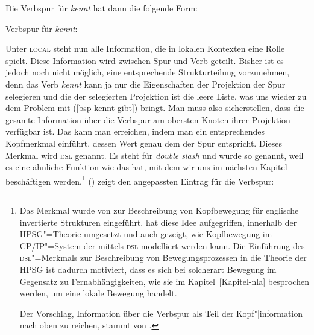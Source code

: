 \noindent
Die Verbspur für \emph{kennt} hat dann die folgende Form:

\eas
\label{le-verbspur-kennt-ohne-dsl}%
Verbspur für \emph{kennt}:\\\samepage
{}
\zs

\noindent
Unter \textsc{local} steht nun alle Information, die in lokalen Kontexten eine Rolle spielt.
Diese Information wird zwischen Spur und Verb geteilt. Bisher ist es jedoch noch nicht möglich,
eine entsprechende Strukturteilung vorzunehmen, denn das Verb \emph{kennt} kann ja nur
die Eigenschaften der Projektion der Spur selegieren und die \compsl der selegierten
Projektion ist die leere Liste, was uns wieder zu dem Problem mit (\ref{bsp-kennt-gibt}) bringt. Man
muss also sicherstellen, dass die gesamte Information über die Verbspur am obersten Knoten
ihrer Projektion verfügbar ist. Das kann man erreichen, indem man ein entsprechendes Kopfmerkmal
einführt, dessen Wert genau dem \localw der Spur entspricht. Dieses Merkmal wird \textsc{dsl}
genannt. Es steht für \emph{double slash} und wurde so genannt, weil es eine ähnliche
Funktion wie das \slashm hat, mit dem wir uns im nächsten Kapitel beschäftigen werden.\footnote{
  Das Merkmal \dsl wurde von \citet*{Jacobson87} zur Beschreibung von Kopfbewegung 
  für englische invertierte Strukturen eingeführt. \citet{Borsley89}
  hat diese Idee aufgegriffen, innerhalb der HPSG"=Theorie umgesetzt und 
  auch gezeigt, wie Kopfbewegung im CP/IP"=System der \gbt mittels \textsc{dsl} modelliert werden
  kann.
  Die Einführung des \textsc{dsl}"=Merkmals zur Beschreibung von Bewegungsprozessen
  in die Theorie der HPSG ist dadurch motiviert, dass es sich bei solcherart Bewegung
  im Gegensatz zu Fernabhängigkeiten, wie sie im Kapitel~\ref{Kapitel-nla}
  besprochen werden, um eine lokale Bewegung handelt.

  Der Vorschlag, Information über die Verbspur als Teil der Kopf"|information nach oben zu reichen,
  stammt von \citet{Oliva92a}.%
}
() zeigt den angepassten Eintrag für die Verbspur:

